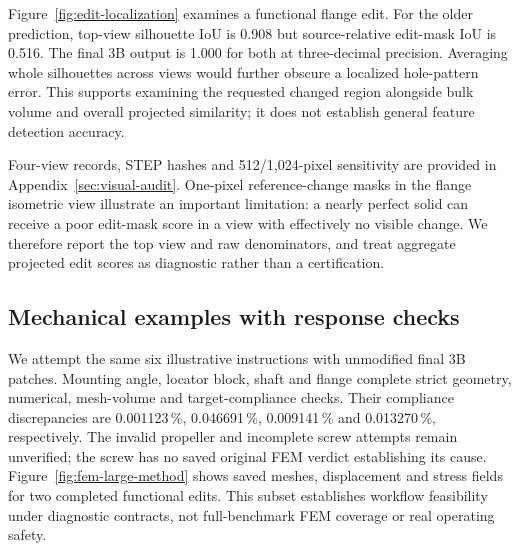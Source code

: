 Figure~\ref{fig:edit-localization} examines a functional flange edit. For the older prediction, top-view silhouette IoU is 0.908 but source-relative edit-mask IoU is 0.516. The final 3B output is 1.000 for both at three-decimal precision. Averaging whole silhouettes across views would further obscure a localized hole-pattern error. This supports examining the requested changed region alongside bulk volume and overall projected similarity; it does not establish general feature detection accuracy.

Four-view records, STEP hashes and 512/1,024-pixel sensitivity are provided in Appendix~\ref{sec:visual-audit}. One-pixel reference-change masks in the flange isometric view illustrate an important limitation: a nearly perfect solid can receive a poor edit-mask score in a view with effectively no visible change. We therefore report the top view and raw denominators, and treat aggregate projected edit scores as diagnostic rather than a certification.

\subsection{Mechanical examples with response checks}
We attempt the same six illustrative instructions with unmodified final 3B patches. Mounting angle, locator block, shaft and flange complete strict geometry, numerical, mesh-volume and target-compliance checks. Their compliance discrepancies are 0.001123\,\%, 0.046691\,\%, 0.009141\,\% and 0.013270\,\%, respectively. The invalid propeller and incomplete screw attempts remain unverified; the screw has no saved original FEM verdict establishing its cause. Figure~\ref{fig:fem-large-method} shows saved meshes, displacement and stress fields for two completed functional edits. This subset establishes workflow feasibility under diagnostic contracts, not full-benchmark FEM coverage or real operating safety.
